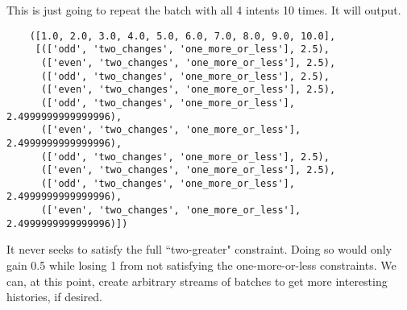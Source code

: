 This is just going to repeat the batch with all 4 intents 10 times. It will output.

\begin{lstlisting}
    ([1.0, 2.0, 3.0, 4.0, 5.0, 6.0, 7.0, 8.0, 9.0, 10.0],
     [(['odd', 'two_changes', 'one_more_or_less'], 2.5),
      (['even', 'two_changes', 'one_more_or_less'], 2.5),
      (['odd', 'two_changes', 'one_more_or_less'], 2.5),
      (['even', 'two_changes', 'one_more_or_less'], 2.5),
      (['odd', 'two_changes', 'one_more_or_less'], 2.4999999999999996),
      (['even', 'two_changes', 'one_more_or_less'], 2.4999999999999996),
      (['odd', 'two_changes', 'one_more_or_less'], 2.5),
      (['even', 'two_changes', 'one_more_or_less'], 2.5),
      (['odd', 'two_changes', 'one_more_or_less'], 2.4999999999999996),
      (['even', 'two_changes', 'one_more_or_less'], 2.4999999999999996)])
\end{lstlisting}

It never seeks to satisfy the full ``two-greater" constraint. Doing so would only gain 0.5 while losing 1 from not satisfying the one-more-or-less constraints. We can, at this point, create arbitrary streams of batches to get more interesting histories, if desired.


